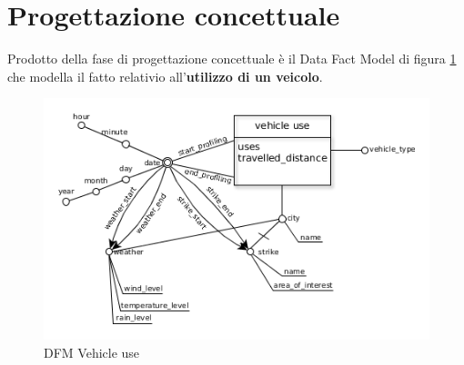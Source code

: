 \section{Progettazione concettuale}

Prodotto della fase di progettazione concettuale è il Data Fact Model di figura
\ref{fig:dfm} che modella il fatto relativio all'\textbf{utilizzo di un veicolo}.

\begin{figure}[H]                                                                                                                                                            
\centering                                                                                                                                                                   
\includegraphics[width=\textwidth]{diagrams/dfm}                                                                                                                                   
\caption{DFM Vehicle use}                                                                                                                                            
\label{fig:dfm}                                                                                                                                                           
\end{figure}

